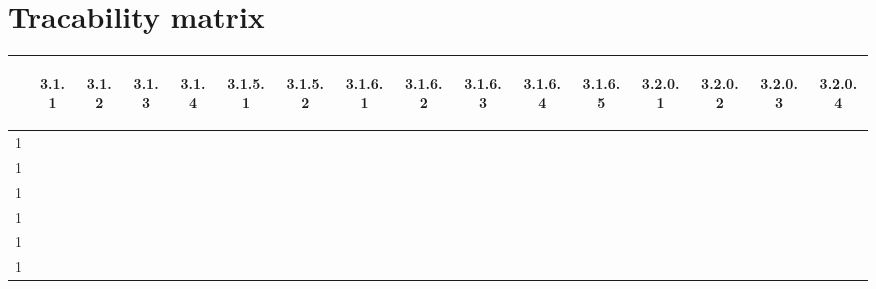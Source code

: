 \documentclass[12pt,a4paper]{article}
\renewcommand{\c}{\checkmark}
\begin{document}
\section{Tracability matrix}
\begin{center}
\begin{tabular}{|l||*{15}{c|}}
\hline
	&\begin{sideways}3.1.1\end{sideways} & \begin{sideways}3.1.2\end{sideways} & \begin{sideways}3.1.3\end{sideways} & \begin{sideways}3.1.4\end{sideways} &
	\begin{sideways}3.1.5.1\end{sideways} & \begin{sideways}3.1.5.2\end{sideways} & \begin{sideways}3.1.6.1\end{sideways} & \begin{sideways}3.1.6.2\end{sideways} & \begin{sideways}3.1.6.3\end{sideways} & \begin{sideways}3.1.6.4\end{sideways} & \begin{sideways}3.1.6.5\end{sideways} &
	\begin{sideways}3.2.0.1\end{sideways} & \begin{sideways}3.2.0.2\end{sideways} & \begin{sideways}3.2.0.3\end{sideways} & \begin{sideways}3.2.0.4\end{sideways}\\
\hline
\hline
1	&\c	&	&	&	&	&	&	&	&	&	&	&	&	&	&	\\
\hline
1	&\c	&	&	&	&	&	&	&	&	&	&	&	&	&	&	\\
\hline
1	&\c	&	&	&	&	&	&	&	&	&	&	&	&	&	&	\\
\hline
1	&\c	&	&	&	&	&	&	&	&	&	&	&	&	&	&	\\
\hline
1	&\c	&	&	&	&	&	&	&	&	&	&	&	&	&	&	\\
\hline
1	&\c	&	&	&	&	&	&	&	&	&	&	&	&	&	&	\\

\end{tabular}
\end{center}
\end{document}
